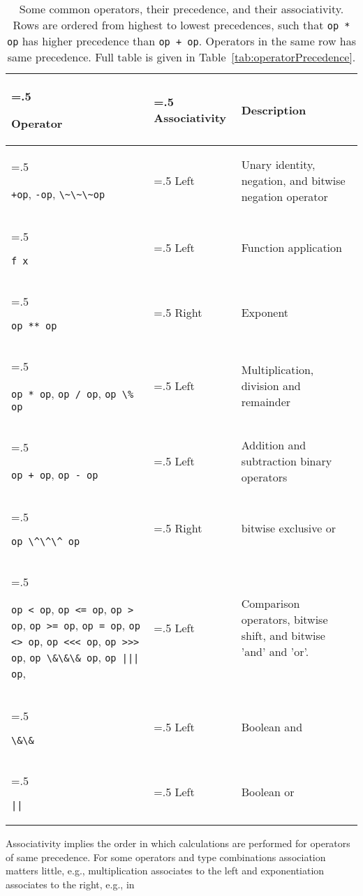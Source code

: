 \begin{table}
  \centering
  \begin{tabularx}{\linewidth}{|>{\hsize=.5\hsize\raggedright\arraybackslash}X|>{\hsize=.5\hsize}X|>{\hsize=2\hsize}X|}
    \hline
    Operator & Associativity & Description\\
    \hline
    \mbox{\lstinline|+op|,} \mbox{\lstinline|-op|,} \mbox{\lstinline|\~\~\~op|} & Left & Unary identity, negation, and bitwise negation operator\\
    \hline
    \lstinline|f x| & Left & Function application\\
    \hline
    \lstinline|op ** op| & Right & Exponent\\ 
    \hline
    \mbox{\lstinline|op * op|,} \mbox{\lstinline|op / op|,} \mbox{\lstinline|op \% op|} & Left & Multiplication, division and remainder\\
    \hline
    \mbox{\lstinline|op + op|,} \mbox{\lstinline|op - op|} & Left & Addition and subtraction binary operators\\
    \hline
    \lstinline|op \^\^\^ op| & Right & bitwise exclusive or\\
    \hline
    \mbox{\lstinline|op < op|,} \mbox{\lstinline|op <= op|,} \mbox{\lstinline|op > op|,} \mbox{\lstinline|op >= op|,} \mbox{\lstinline|op = op|,} \mbox{\lstinline|op <> op|,} \mbox{\lstinline|op <<< op|,} \mbox{\lstinline|op >>> op|,} \mbox{\lstinline|op \&\&\& op|,} \mbox{\lstinline!op ||| op!,}
             & Left & Comparison operators, bitwise shift, and bitwise 'and' and 'or'.\\
    \hline
    \lstinline|\&\&| & Left & Boolean and\\
    \hline
    \lstinline+||+ & Left & Boolean or\\
    \hline
  \end{tabularx}
  \caption{Some common operators, their precedence, and their associativity. Rows are ordered from highest to lowest precedences, such that \lstinline|op * op| has higher precedence than \lstinline|op + op|. Operators in the same row has same precedence. Full table is given in Table~\ref{tab:operatorPrecedence}.}
  \label{tab:someOperatorPrecedences}
\end{table}
Associativity implies the order in which calculations are performed for operators of same precedence. For some operators and type combinations association matters little, e.g., multiplication associates to the left and exponentiation associates to the right, e.g., in
